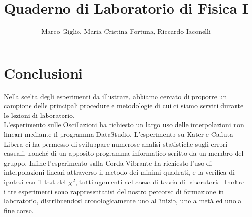 \documentclass[a4paper,10pt]{report}
\author{Marco Giglio, Maria Cristina Fortuna, Riccardo Iaconelli}
\title{Quaderno di Laboratorio di Fisica I}
\begin{document}
\maketitle

\tableofcontents

%
%

%
%

%
%

%
\chapter*{Conclusioni}
Nella scelta degli esperimenti da illustrare, abbiamo cercato di proporre un campione delle principali procedure e metodologie di cui ci siamo serviti durante le lezioni di laboratorio.\\
L'esperimento sulle Oscillazioni ha richiesto un largo uso delle interpolazioni non lineari mediante il programma DataStudio.
L'esperimento su Kater e Caduta Libera ci ha permesso di sviluppare numerose analisi statistiche sugli errori casuali, nonché di un apposito programma informatico scritto da un membro del gruppo.
Infine l'esperimento sulla Corda Vibrante ha richiesto l'uso di interpolazioni lineari attraverso il metodo dei minimi quadrati, e la verifica di ipotesi con il test del $\chi^2$, tutti agomenti del corso di teoria di laboratorio.
Inoltre i tre esperimenti sono rappresentativi del nostro percorso di formazione in laboratorio, distribuendosi cronologicamente uno all'inizio, uno a metà ed uno a fine corso.   
\end{document}
